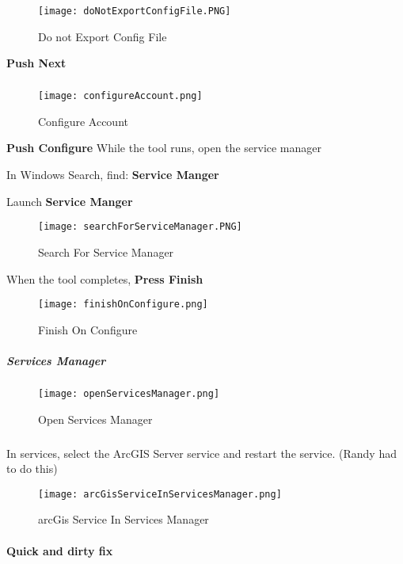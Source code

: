 \begin{figure}[h!]
\centering
\texttt{[image: doNotExportConfigFile.PNG]}
\caption{Do not Export Config File}
\end{figure}
\noindent\textbf{\Large Push Next}
\subparagraph*{}
\begin{figure}[h!]
\centering
\texttt{[image: configureAccount.png]}
\caption{Configure Account}
\end{figure}
\noindent\textbf{\Large Push Configure}
\clearpage
\noindent While the tool runs, open the service manager
\vspace{.2in}

\noindent In Windows Search, find: \textbf{Service Manger}
\vspace{.2in}

\noindent Launch \textbf{Service Manger}
\begin{figure}[h!]
\centering
\texttt{[image: searchForServiceManager.PNG]}
\caption{Search For Service Manager}
\end{figure}
\vspace{.2in}

\noindent When the tool completes, \textbf{\Large Press Finish}
\begin{figure}[h!]
\centering
\texttt{[image: finishOnConfigure.png]}
\caption{Finish On Configure}
\end{figure}
\clearpage
\subparagraph*{Services Manager}
\begin{figure}[h!]
\centering
\texttt{[image: openServicesManager.png]}
\caption{Open Services Manager}
\end{figure}
\subparagraph*{}
\noindent In services, select the ArcGIS Server service and restart the service.  (Randy had to do this)\\

\begin{figure}[h!]
\centering
\texttt{[image: arcGisServiceInServicesManager.png]}
\caption{arcGis Service In Services Manager}
\end{figure}


\clearpage


\paragraph*{Quick and dirty fix\texorpdfstring{\\}{}}

